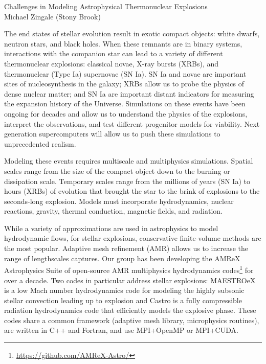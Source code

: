 \documentclass[11pt]{article}
\begin{document}
\begin{center}
{\Large Challenges in Modeling Astrophysical Thermonuclear Explosions} \\[0.25em]
Michael Zingale (Stony Brook)
\end{center}

The end states of stellar evolution result in exotic compact objects:
white dwarfs, neutron stars, and black holes.  When these remnants are
in binary systems, interactions with the companion star can lead to a
variety of different thermonuclear explosions: classical novae, X-ray
bursts (XRBs), and thermonuclear (Type Ia) supernovae (SN Ia).  SN Ia
and novae are important sites of nucleosynthesis in the galaxy; XRBs
allow us to probe the physics of dense nuclear matter; and SN Ia are
important distant indicators for measuring the expansion history of
the Universe.  Simulations on these events have been ongoing for
decades and allow us to understand the physics of the explosions,
interpret the observations, and test different progenitor models for
viability.  Next generation supercomputers will allow us to push these
simulations to unprecedented realism.

Modeling these events requires multiscale and multiphysics simulations.
Spatial scales range from the size of the compact object
down to the burning or dissipation scale.  Temporary scales range from
the millions of years (SN Ia) to hours (XRBs) of evolution that
brought the star to the brink of explosions to the seconds-long
explosion.  Models must incorporate hydrodynamics, nuclear reactions,
gravity, thermal conduction, magnetic fields, and radiation.

While a variety of approximations are used in astrophysics to model
hydrodynamic flows, for stellar explosions, conservative finite-volume
methods are the most popular.  Adaptive mesh refinement (AMR) allows
us to increase the range of lengthscales captures.  Our group has been
developing the AMReX Astrophysics Suite of open-source AMR
multiphysics hydrodynamics
codes\footnote{\url{https://github.com/AMReX-Astro/}} for over a
decade.  Two codes in particular address stellar explosions: MAESTROeX
is a low Mach number hydrodynamics code for modeling the highly
subsonic stellar convection leading up to explosion and Castro is a
fully compressible radiation hydrodynamics code that efficiently
models the explosive phase.  These codes share a common framework
(adaptive mesh library, microphysics routines), are written in C++ and Fortran,
and use MPI+OpenMP or MPI+CUDA.
\end{document}
